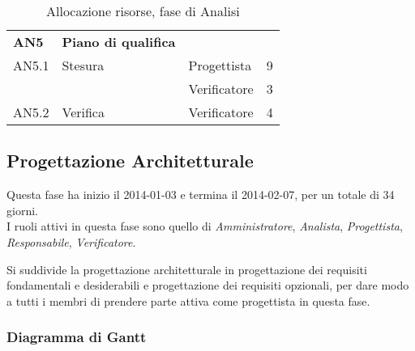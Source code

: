 \begin{table}[H]
\begin{tabular}{ l l l c  }
	\hline
	\textbf{AN5} & \textbf{Piano di qualifica} \\
	\cline{3-4}
	AN5.1 & Stesura & Progettista& 9\\ 
    & & Verificatore & 3 \\
    \cline{3-4}
	AN5.2 & Verifica & Verificatore &  4\\
	
	\hline
	\end{tabular}
	\caption{Allocazione risorse, fase di Analisi}
	\end{table}

	\subsection{Progettazione Architetturale}
	
Questa fase ha inizio il 2014-01-03 e termina il 2014-02-07, per un totale di 34  giorni. \\
I ruoli attivi in questa fase sono quello di \textit{Amministratore}, \textit{Analista}, \textit{Progettista}, \textit{Responsabile}, \textit{Verificatore}.

Si suddivide la progettazione architetturale in progettazione dei requisiti fondamentali e desiderabili e progettazione dei requisiti opzionali, per dare modo a tutti i membri di prendere parte attiva come progettista in questa fase.

\subsubsection{Diagramma di Gantt}

